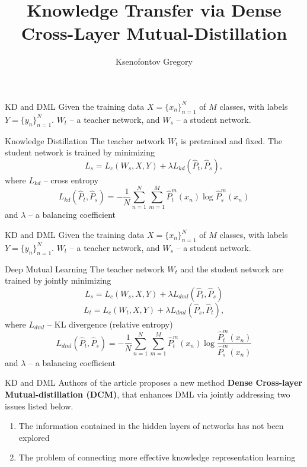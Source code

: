 \documentclass{beamer}
\title{Knowledge Transfer via Dense Cross-Layer Mutual-Distillation}
\author{Ksenofontov Gregory}
\institute{MIPT}
\begin{document}
\begin{frame}
    \titlepage
\end{frame}

\begin{frame}{KD and DML}
 Given the training data $X = \{x_n\}^N_{n=1}$ of $M$ classes, with labels $Y = \{y_n\}^N_{n=1}$. $W_t$ -- a teacher network, and  $W_s$ -- a student network.
    \begin{block}{Knowledge Distillation}
        The teacher network $W_t$ is pretrained and fixed. The student network is trained by minimizing
        $$L_s = L_c(W_s, X, Y) + \lambda L_{kd}(\hat P_t, \hat P_s), $$
        where $L_{kd}$ -- cross entropy 
        $$L_{kd}(\hat P_t,\hat P_s) = − \frac1N \sum^N_{n=1}\sum^M_{m=1} \hat P^m_t(x_n) \log\hat P^m_s (x_n)$$
        and $\lambda$ -- a balancing coefficient
    \end{block}
\end{frame}

\begin{frame}{KD and DML}
 Given the training data $X = \{x_n\}^N_{n=1}$ of $M$ classes, with labels $Y = \{y_n\}^N_{n=1}$. $W_t$ -- a teacher network, and  $W_s$ -- a student network.
    \begin{block}{Deep Mutual Learning}
        The teacher network $W_t$ and the student network are trained by jointly minimizing
        $$L_s = L_c(W_s, X, Y) + \lambda L_{dml}(\hat P_t, \hat P_s)$$
        $$L_t = L_c(W_t, X, Y) + \lambda L_{dml}(\hat P_s, \hat P_t), $$
        where $L_{dml}$ -- KL divergence (relative entropy)
        $$L_{dml}(\hat P_t,\hat P_s) = − \frac1N \sum^N_{n=1}\sum^M_{m=1} \hat P^m_t(x_n) \log\frac{\hat P^m_t (x_n)}{\hat P^m_s (x_n)}$$
        and $\lambda$ -- a balancing coefficient
    \end{block}
\end{frame}

\begin{frame}{KD and DML}
Authors of the article proposes a new method \textbf{Dense Cross-layer Mutual-distillation (DCM)}, that enhances DML via jointly addressing two issues listed below.
    \begin{enumerate}
        \item The information contained in the hidden layers of networks has not been explored
        \item The problem of connecting more effective knowledge representation learning
    \end{enumerate}
\end{frame}
\end{document}
